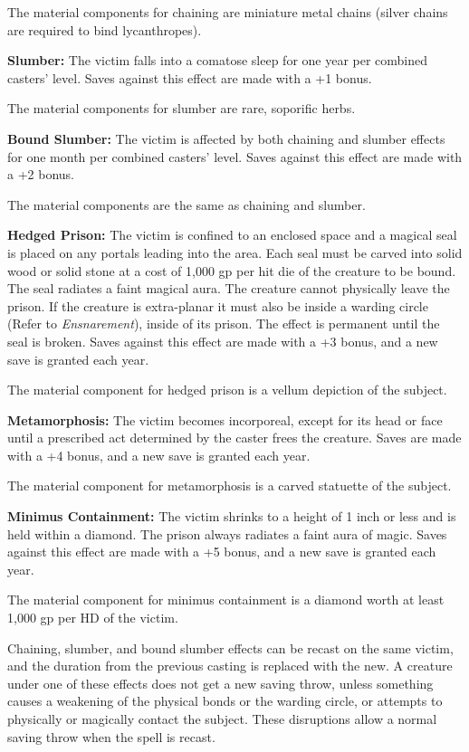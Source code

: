 \begin{multicols}{2}
The material components for chaining are miniature metal chains (silver chains are required to bind lycanthropes).  

\textbf{Slumber:} The victim falls into a comatose sleep for one year per combined casters' level.  Saves against this effect are made with a +1 bonus.  

The material components for slumber are rare, soporific herbs.

\textbf{Bound Slumber:} The victim is affected by both chaining and slumber effects for one month per combined casters' level.  Saves against this effect are made with a +2 bonus.  

The material components are the same as chaining and slumber.

\textbf{Hedged Prison:} The victim is confined to an enclosed space and a magical seal is placed on any portals leading into the area.  Each seal must be carved into solid wood or solid stone at a cost of 1,000 gp per hit die of the creature to be bound.  The seal radiates a faint magical aura.  The creature cannot physically leave the prison.  If the creature is extra-planar it must also be inside a warding circle (Refer to \textit{Ensnarement}), inside of its prison.  The effect is permanent until the seal is broken.  Saves against this effect are made with a +3 bonus, and a new save is granted each year.  

The material component for hedged prison is a vellum depiction of the subject.  

\textbf{Metamorphosis:} The victim becomes incorporeal, except for its head or face until a prescribed act determined by the caster frees the creature.  Saves are made with a +4 bonus, and a new save is granted each year.  

The material component for metamorphosis is a carved statuette of the subject.

\textbf{Minimus Containment:} The victim shrinks to a height of 1 inch or less and is held within a diamond.  The prison always radiates a faint aura of magic.  Saves against this effect are made with a +5 bonus, and a new save is granted each year.  

The material component for minimus containment is a diamond worth at least 1,000 gp per HD of the victim.

Chaining, slumber, and bound slumber effects can be recast on the same victim, and the duration from the previous casting is replaced with the new.  A creature under one of these effects does not get a new saving throw, unless something causes a weakening of the physical bonds or the warding circle, or attempts to physically or magically contact the subject.  These disruptions allow a normal saving throw when the spell is recast. 


\end{multicols}
